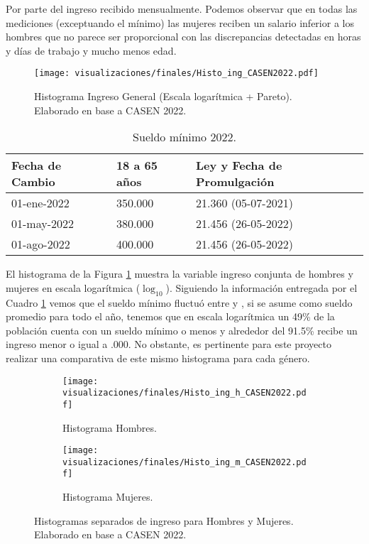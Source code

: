 Por parte del ingreso recibido mensualmente. Podemos observar que en todas las mediciones (exceptuando el mínimo) las mujeres reciben un salario inferior a los hombres que no parece ser proporcional con las discrepancias detectadas en horas y días de trabajo y mucho menos edad.

\FloatBarrier

\begin{figure}[htbp]
	\centering
	\texttt{[image: visualizaciones/finales/Histo\_ing\_CASEN2022.pdf]}
	\caption{Histograma Ingreso General (Escala logarítmica + Pareto). Elaborado en base a CASEN 2022.}
	\label{05fig} 
\end{figure}

\FloatBarrier	

\begin{table}[htbp]
	\centering
	\begin{tabularx}{\textwidth}{|X|X|X|}
		\hline
		Fecha de Cambio & 18 a 65 años & Ley y Fecha de Promulgación\\
		\hline
		01-ene-2022 & 350.000 & 21.360 (05-07-2021) \\\hline
		01-may-2022 & 380.000 & 21.456 (26-05-2022) \\\hline
		01-ago-2022 & 400.000 & 21.456 (26-05-2022) \\\hline
	\end{tabularx}
	\caption{\label{sueldominimo} Sueldo mínimo 2022. \citep{cyma}}
\end{table}

\FloatBarrier

El histograma de la Figura \ref{05fig} muestra la variable ingreso conjunta de hombres y mujeres en escala logarítmica (\(\log_{10}\)). Siguiendo la información entregada por el Cuadro \ref{sueldominimo} vemos que el sueldo mínimo fluctuó entre  y , si se asume  como sueldo promedio para todo el año, tenemos que en escala logarítmica un 49\% de la población cuenta con un sueldo mínimo o menos y alrededor del 91.5\% recibe un ingreso menor o igual a .000. No obstante, es pertinente para este proyecto realizar una comparativa de este mismo histograma para cada género.

\FloatBarrier

\begin{figure}[htbp]
	\centering
	\begin{subfigure}[b]{0.49\textwidth}
		\centering
		\texttt{[image: visualizaciones/finales/Histo\_ing\_h\_CASEN2022.pdf]}
		\caption{Histograma Hombres.}
		\label{6a} 
	\end{subfigure}
	\hfill
	\begin{subfigure}[b]{0.49\textwidth}
		\centering
		\texttt{[image: visualizaciones/finales/Histo\_ing\_m\_CASEN2022.pdf]}
		\caption{Histograma Mujeres.}
		\label{6b}
	\end{subfigure}
	\caption{Histogramas separados de ingreso para Hombres y Mujeres. Elaborado en base a CASEN 2022.}
	\label{06fig}
\end{figure}

